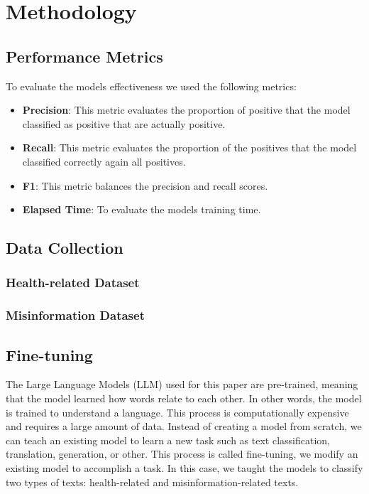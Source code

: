 
\chapter{Methodology}  

\section{Performance Metrics}
To evaluate the models effectiveness we used the following metrics:

\begin{itemize}
	\item{\textbf{Precision}}: This metric evaluates the proportion of positive that the model classified as positive that are actually positive.
	\item{\textbf{Recall}}: This metric evaluates the proportion of the positives that the model classified correctly again all positives.
	\item{\textbf{F1}}: This metric balances the precision and recall scores.
	\item{\textbf{Elapsed Time}}: To evaluate the models training time.
	
\end{itemize}


\section{Data Collection}


\subsection{Health-related Dataset}

\subsection{Misinformation Dataset}


\section{Fine-tuning}

The Large Language Models (LLM) used for this paper are pre-trained, meaning that the model learned how words relate to each other. In other words, the model is trained to understand a language.
This process is computationally expensive and requires a large amount of data. Instead of creating a model from scratch, we can teach an existing model to learn a new task such as text classification,
translation, generation, or other. This process is called fine-tuning, we modify an existing model to accomplish a task. In this case, we taught the models to classify two types of texts: health-related and
misinformation-related texts. 
\newline

